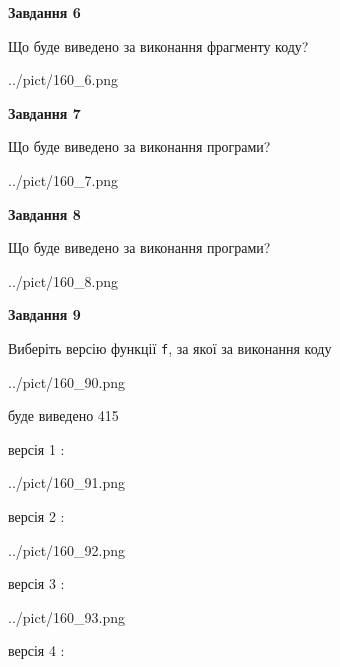 \documentclass[12pt, ukrainian]{article}
\def\code#1{\Verb!#1!}
\begin{document}
{\begin {large}
{\begin {center}\textbf{Завдання 6}\end {center}}

Що буде виведено за виконання фрагменту коду?\par
\begin{center}
	{../pict/160_6.png}
\end{center}
\newpage

{\begin {center}\textbf{Завдання 7}\end {center}}

Що буде виведено за виконання програми?\par
\begin{center}
	{../pict/160_7.png}
\end{center}
\newpage

{\begin {center}\textbf{Завдання 8}\end {center}}

Що буде виведено за виконання програми?\par
\begin{center}
	{../pict/160_8.png}
\end{center}
\newpage

{\begin {center}\textbf{Завдання 9}\end {center}}

Виберіть версію функції \code{f}, за якої за виконання коду
\begin{center}
	{../pict/160_90.png}
\end{center}
буде виведено 415

\vspace{5mm}
версія 1 :

\begin{center}
	{../pict/160_91.png}
\end{center}
версія 2 :

\begin{center}
	{../pict/160_92.png}
\end{center}
версія 3 :

\begin{center}
	{../pict/160_93.png}
\end{center}
версія 4 :


\end{large}}
\end{document}
